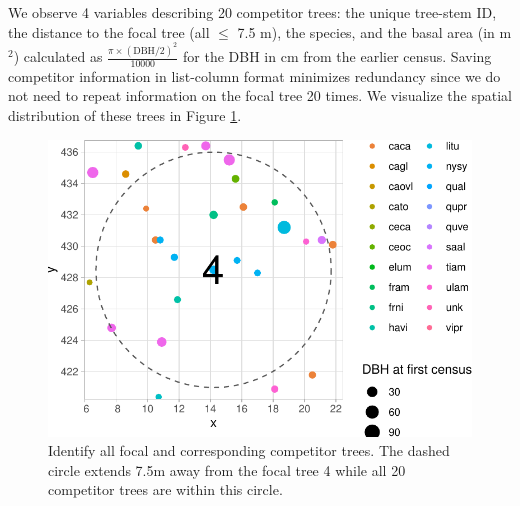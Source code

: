 \documentclass[12pt]{article}
\newenvironment{Shaded}{\begin{snugshade}}{\end{snugshade}}
\newcommand{\CommentTok}[1]{\textcolor[rgb]{0.56,0.35,0.01}{\textit{#1}}}
\newcommand{\DataTypeTok}[1]{\textcolor[rgb]{0.13,0.29,0.53}{#1}}
\newcommand{\DecValTok}[1]{\textcolor[rgb]{0.00,0.00,0.81}{#1}}
\newcommand{\KeywordTok}[1]{\textcolor[rgb]{0.13,0.29,0.53}{\textbf{#1}}}
\newcommand{\NormalTok}[1]{#1}
\newcommand{\OperatorTok}[1]{\textcolor[rgb]{0.81,0.36,0.00}{\textbf{#1}}}
\newcommand{\StringTok}[1]{\textcolor[rgb]{0.31,0.60,0.02}{#1}}
\begin{document}
\begin{Shaded}
\end{Shaded}

We observe 4 variables describing 20 competitor trees: the unique
tree-stem ID, the distance to the focal tree (all \(\leq\) 7.5 m), the
species, and the basal area (in m\(^2\)) calculated as
\(\frac{\pi \times (\text{DBH/2})^2}{10000}\) for the DBH in cm from the
earlier census. Saving competitor information in list-column format
minimizes redundancy since we do not need to repeat information on the
focal tree 20 times. We visualize the spatial distribution of these
trees in Figure \ref{fig:scbi-focal-vs-comp-map}.

\begin{figure}

{\centering \includegraphics[width=0.66\linewidth]{Figures/scbi-focal-vs-comp-map-1} 

}

\caption{Identify all focal and corresponding competitor trees. The dashed circle extends 7.5m away from the focal tree 4 while all 20 competitor trees are within this circle.}\label{fig:scbi-focal-vs-comp-map}
\end{figure}
\end{document}
